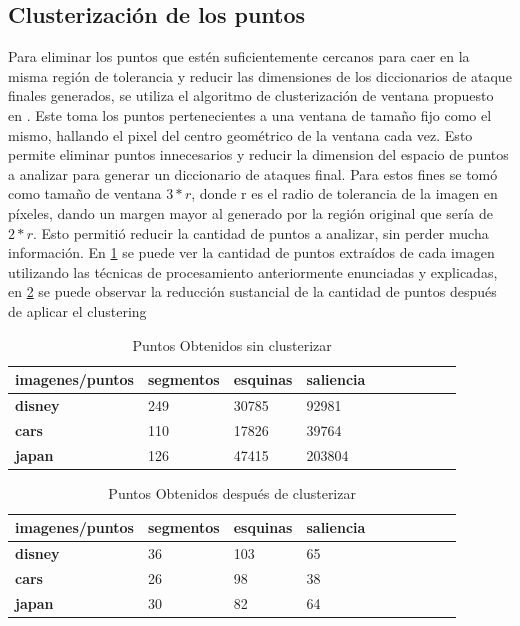 \subsection{Clusterizaci\'on de los puntos }
Para eliminar los puntos que est\'en suficientemente cercanos para caer en la misma regi\'on de tolerancia y reducir las dimensiones de los diccionarios de ataque finales generados, se utiliza el algoritmo de clusterizaci\'on de ventana propuesto en \cite{van2010purely}. Este toma los puntos pertenecientes a una ventana de tama\~no fijo como el mismo, hallando el pixel del centro geom\'etrico de la ventana cada vez. Esto permite eliminar puntos innecesarios y reducir la dimension del espacio de puntos a analizar para generar un diccionario de ataques final. Para estos fines se tom\'o como tama\~no de ventana $3*r$, donde r es el radio de tolerancia de la imagen en p\'ixeles, dando un margen mayor al generado por la regi\'on original que ser\'ia de $2*r$. Esto permiti\'o reducir la cantidad de puntos a analizar, sin perder mucha informaci\'on. En \ref{points:void} se puede ver la cantidad de puntos extra\'idos de cada imagen utilizando las t\'ecnicas de procesamiento anteriormente enunciadas y explicadas, en \ref{points:cluster} se puede observar la reducci\'on sustancial de la cantidad de puntos despu\'es de aplicar el clustering
\begin{table}[H]
	\centering
	\caption{Puntos Obtenidos sin clusterizar}
	\label{points:void}
	\begin{tabular}{|l|l|l|l|l|l|l|l|l|l|}
		\hline
		\textbf{imagenes/puntos} & \textbf{segmentos } & \textbf{esquinas} & \textbf{saliencia}
		\\ \hline
		\textbf{disney} & 249 & 30785 & 92981 \\ \hline
		\textbf{cars} & 110 & 17826 & 39764 \\ \hline
		\textbf{japan} & 126 & 47415 & 203804  \\ \hline
	
	\end{tabular}
\end{table}

\begin{table}[H]
	\centering
	\caption{Puntos Obtenidos despu\'es de clusterizar}
		\label{points:cluster}
	\begin{tabular}{|l|l|l|l|l|l|l|l|l|l|}
		\hline
		\textbf{imagenes/puntos} & \textbf{segmentos} & \textbf{esquinas} & \textbf{saliencia }  \\ \hline
		\textbf{disney} & 36 & 103 & 65  \\ \hline
		\textbf{cars} & 26 & 98 & 38  \\ \hline
		\textbf{japan} & 30 & 82 & 64 \\ \hline
	\end{tabular}
\end{table}

